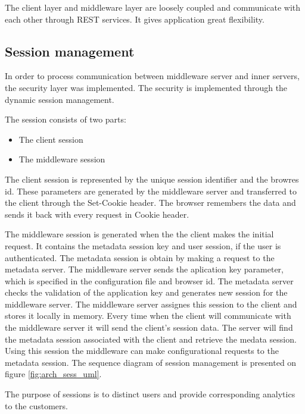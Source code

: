 The client layer and middleware layer are loosely coupled and communicate with each other through REST services. It gives application great flexibility.



\subsection{Session management}


In order to process communication between middleware server and inner servers, the security layer was implemented. The security is implemented through the dynamic session management.

The session consists of two parts: 
\begin{itemize}
	\item The client session
	\item The middleware session
\end{itemize}

The client session is represented by the unique session identifier and the browres id. These parameters are generated by the middleware server and transferred to the client through the Set-Cookie header. The browser remembers the data and sends it back with every request in Cookie header.

The middleware session is generated when the the client makes the initial request. It contains the metadata session key and user session, if the user is authenticated. The metadata session is obtain by making a request to the metadata server. The middleware server sends the aplication key parameter, which is specified in the configuration file and browser id. The metadata server checks the validation of the application key and generates new session for the middleware server. The middleware server assignes this session to the client and stores it locally in memory. Every time when the client will communicate with the middleware server it will send the client's session data. The server will find the metadata session associated with the client and retrieve the medata session. Using this session the middleware can make configurational requests to the metadata session. The sequence diagram of session management is presented on figure \ref{fig:arch_sess_uml}.

The purpose of sessions is to distinct users and provide corresponding analytics to the customers.


